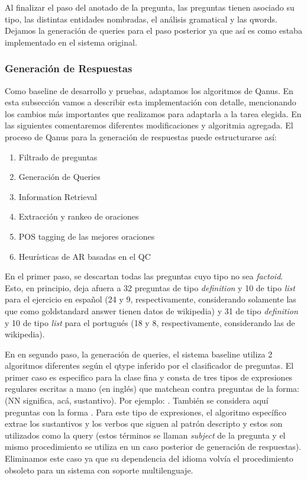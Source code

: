 Al finalizar el paso del anotado de la pregunta, las preguntas tienen asociado su tipo, las distintas entidades nombradas, el análisis gramatical y las qwords. Dejamos la generación de queries para el paso posterior ya que así es como estaba implementado en el sistema original.

\subsubsection{Generación de Respuestas}

Como baseline de desarrollo y pruebas, adaptamos los algoritmos de Qanus. En esta subsección vamos a describir esta implementación con detalle, mencionando los cambios más importantes que realizamos para adaptarla a la tarea elegida. En las siguientes comentaremos diferentes modificaciones y algoritmia agregada. El proceso de Qanus para la generación de respuestas puede estructurarse así:
\begin{enumerate}
  \item Filtrado de preguntas
  \item Generación de Queries
  \item Information Retrieval
  \item Extracción y rankeo de oraciones
  \item POS tagging de las mejores oraciones
  \item Heurísticas de AR basadas en el QC
\end{enumerate}

En el primer paso, se descartan todas las preguntas cuyo tipo no sea \textit{factoid}. Esto, en principio, deja afuera a 32 preguntas de tipo \textit{definition} y 10 de tipo \textit{list} para el ejercicio en español (24 y 9, respectivamente, considerando solamente las que como goldstandard answer tienen datos de wikipedia) y 31 de tipo \textit{definition} y 10 de tipo \textit{list} para el portugués (18 y 8, respectivamente, considerando las de wikipedia).

En en segundo paso, la generación de queries, el sistema baseline utiliza 2 algoritmos diferentes según el qtype inferido por el clasificador de preguntas. El primer caso es especifico para la clase fina  y consta de tres tipos de expresiones regulares escritas a mano (en inglés) que matchean contra preguntas de la forma:  (NN significa, acá, sustantivo). Por ejemplo: . También se considera aquí preguntas con la forma . Para este tipo de expresiones, el algoritmo específico extrae los sustantivos y los verbos que siguen al patrón descripto y estos son utilizados como la query (estos términos se llaman \textit{subject} de la pregunta y el mismo procedimiento se utiliza en un caso posterior de generación de respuestas). Eliminamos este caso ya que su dependencia del idioma volvía el procedimiento obsoleto para un sistema con soporte multilenguaje.

